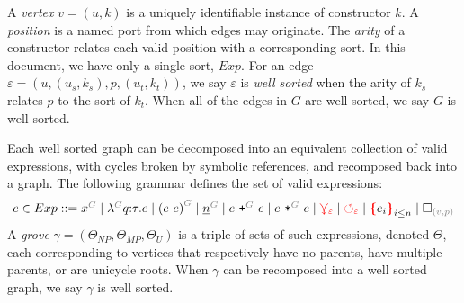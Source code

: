 \documentclass[nonacm, acmsmall, screen, review]{acmart}
\newcommand{\e}{\varepsilon}
\newcommand{\SetOf}[1]{\left\{#1\right\}}
\newcommand{\id}[1]{\textcolor{gray}{\ensuremath{#1}}}
\newcommand{\eid}[2]{{#2}^{\id{#1}}}
\newcommand{\eVar}[2]{\eid{#1}{#2}}
\newcommand{\eFun}[4]{\eid{#1}{\lambda}#2{:}#3{.}#4}
\newcommand{\eApp}[3]{\eid{#1}{\left(#2~#3\right)}}
\newcommand{\eNum}[2]{\eid{#1}{\underline{#2}}}
\newcommand{\ePlus}[3]{#2~\eid{#1}{\texttt{+}}~#3}
\newcommand{\eTimes}[3]{#2~\eid{#1}{\texttt{*}}~#3}
\newcommand{\pVar}[2]{\eid{#1}{#2}}
\newcommand{\tArrow}[3]{#2 \eid{#1}{\rightarrow} #3}
\newcommand{\tNum}[1]{\eid{#1}{Num}}
\newcommand{\conflictHole}[1]{%
{\noexpandarg\StrSubstitute{#1}{,}{\textcolor{red}{\,\textbf{|}\,}}[\myargs]%
{\textcolor{red}{\textbf{\{}}\myargs\textcolor{red}{\textbf{\}}}}}}%
\newcommand{\emptyHole}[2]{\square_{\id{(#1, #2)}}}
\newcommand{\multiVertex}[1]{\textcolor{red}{\ensuremath{\curlyveedownarrow_{#1}}}}
\newcommand{\cycleVertex}[1]{\textcolor{red}{\ensuremath{\circlearrowleft_{#1}}}}
\newcommand{\ExpNum}{\mathsf{Exp\_num}}
\newcommand{\LamParam}{\mathsf{Param}}
\newcommand{\LamType}{\mathsf{Type}}
\newcommand{\LamBody}{\mathsf{Body}}
\def\outlinepad{0.4pt}
\def\outlinestroke{0.4pt}
\newcommand{\Minus}{\mathord{
\begin{tikzpicture}[anchor=base, baseline]
\path[draw, line width=\outlinestroke]
   ( 0.306em+\outlinestroke/2+\outlinepad,  0.270em+\outlinestroke/2+\outlinepad)
 --( 0.306em+\outlinestroke/2+\outlinepad,  0.229em-\outlinestroke/2-\outlinepad)
 --(-0.306em-\outlinestroke/2-\outlinepad,  0.229em-\outlinestroke/2-\outlinepad)
 --(-0.306em-\outlinestroke/2-\outlinepad,  0.270em+\outlinestroke/2+\outlinepad)
 --cycle
 ;
\end{tikzpicture}
}}
\begin{document}
A \emph{vertex} $v{=}(u, k)$ is a uniquely identifiable instance of constructor $k$.
A \emph{position} is a named port from which edges may originate.
%
The \emph{arity} of a constructor relates each valid position with a corresponding sort.
In this document, we have only a single sort, $Exp$.
For an edge $\e{=}(u, (u_s, k_s), p, (u_t, k_t))$, we say $\e$ is \emph{well sorted} when the arity of $k_s$ relates $p$ to the sort of $k_t$.
When all of the edges in $G$ are well sorted, we say $G$ is well sorted.

Each well sorted graph can be decomposed into an equivalent collection of valid expressions,
with cycles broken by symbolic references,
and recomposed back into a graph.
The following grammar defines the set of valid expressions:
\[
  \arraycolsep=0pt
  \begin{array}{lcllll}
    e & {}\in{} & Exp & {}::={} &
      \eVar{G}{x}
      \mid \eFun{G}{q}{\tau}{e}
      \mid \eApp{G}{e}{e}
      \mid \eNum{G}{n}
      \mid \ePlus{G}{e}{e}
      \mid \eTimes{G}{e}{e}
      \mid \multiVertex{\e}
      \mid \cycleVertex{\e}
      \mid \conflictHole{e_i}_{i \leq n}
      \mid \emptyHole{v}{p}
    \\
  \end{array}
\]
A \emph{grove} $\gamma = (\Theta_{NP}, \Theta_{MP}, \Theta_{U})$ is a triple of sets of such expressions, denoted $\Theta$, each corresponding to vertices that respectively have no parents, have multiple parents, or are unicycle roots.
When $\gamma$ can be recomposed into a well sorted graph, we say $\gamma$ is well sorted.
\end{document}
